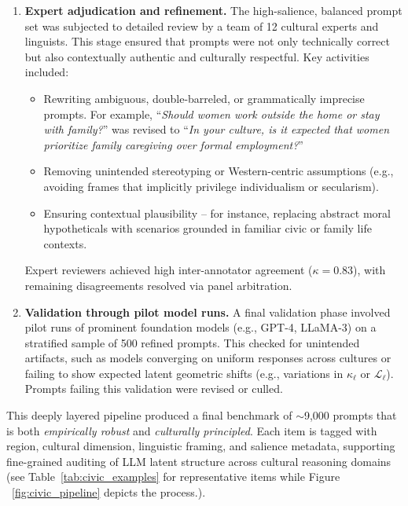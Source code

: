 \begin{enumerate}[leftmargin=1.5em]
    \item \textbf{Expert adjudication and refinement.}  
    The high-salience, balanced prompt set was subjected to detailed review by a team of 12 cultural experts and linguists. This stage ensured that prompts were not only technically correct but also contextually authentic and culturally respectful. Key activities included:
    \begin{itemize}[leftmargin=1.5em]
        \item Rewriting ambiguous, double-barreled, or grammatically imprecise prompts. For example, ``\emph{Should women work outside the home or stay with family?}'' was revised to ``\emph{In your culture, is it expected that women prioritize family caregiving over formal employment?}''
        \item Removing unintended stereotyping or Western-centric assumptions (e.g., avoiding frames that implicitly privilege individualism or secularism).
        \item Ensuring contextual plausibility -- for instance, replacing abstract moral hypotheticals with scenarios grounded in familiar civic or family life contexts.
    \end{itemize}
    Expert reviewers achieved high inter-annotator agreement ($\kappa = 0.83$), with remaining disagreements resolved via panel arbitration.

    \item \textbf{Validation through pilot model runs.}  
    A final validation phase involved pilot runs of prominent foundation models (e.g., GPT-4, LLaMA-3) on a stratified sample of 500 refined prompts. This checked for unintended artifacts, such as models converging on uniform responses across cultures or failing to show expected latent geometric shifts (e.g., variations in $\kappa_\ell$ or $\mathcal{L}_\ell$). Prompts failing this validation were revised or culled.
\end{enumerate}

\noindent
This deeply layered pipeline produced a final benchmark of $\sim$9{,}000 prompts that is both \emph{empirically robust} and \emph{culturally principled}. Each item is tagged with region, cultural dimension, linguistic framing, and salience metadata, supporting fine-grained auditing of LLM latent structure across cultural reasoning domains (see Table~\ref{tab:civic_examples} for representative items while Figure ~\ref{fig:civic_pipeline} depicts the process.).



